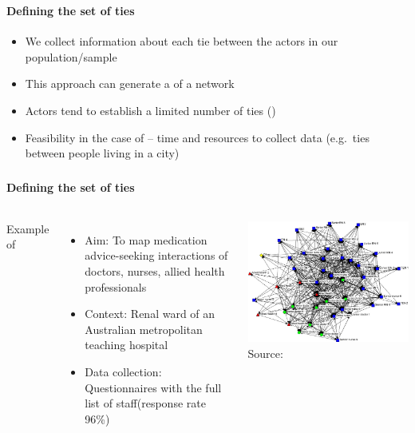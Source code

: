 \documentclass[8pt]{beamer}
\begin{document}

\begin{frame}
\frametitle{\insertsection}
\framesubtitle{Defining the set of ties}

{\color{blue}{Full-network method}}
\begin{itemize}
\item We collect information about each tie between the actors in our population/sample
\item This approach can generate a {\color{dkgreen}{comprehensive map}} of a network
\item Actors tend to establish a limited number of ties ({\color{blue}{limited attentional capabilities}})
\item Feasibility in the case of {\color{red}{relatively small networks}} -- time and resources to collect data  (e.g.\ ties between people living in a city)
\end{itemize}

\end{frame}


\begin{frame}
\frametitle{\insertsection}
\framesubtitle{Defining the set of ties}

\begin{columns}[c]
Example of {\color{blue}{full-network method}}
\begin{itemize}
\item Aim: To map medication advice-seeking interactions of doctors, nurses, allied health professionals 
\item Context: Renal ward of an Australian metropolitan teaching hospital
\item Data collection: Questionnaires with the full list of staff(response rate 96\%)
\end{itemize}

\centering
\includegraphics[width=\textwidth]{full_example.jpg}\\
\tiny{Source: \citet{Creswick2010}}

\end{columns}

\end{frame}
\end{document}
